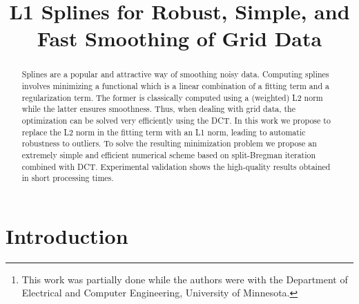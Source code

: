 \documentclass[preprint]{imsart}
\begin{document}
\begin{frontmatter}
\title{L1 Splines for Robust, Simple, and Fast Smoothing of Grid Data}

\begin{aug}
  \author{
     
  }

  \author{
     
  }

  \address{
    Department of Electrical and Computer Engineering, Duke University.\footnote{This work was partially done while the authors were with the Department of Electrical and Computer Engineering, University of Minnesota.}\\
  }
  

\end{aug}

\begin{abstract}
Splines are a popular and attractive way of smoothing noisy data. Computing splines involves minimizing a functional which is a linear combination of a fitting term and a regularization term. The former is classically computed using a (weighted) L2 norm while the latter ensures smoothness. Thus, when dealing with grid data, the optimization can be solved very efficiently using the DCT. In this work we propose to replace the L2 norm in the fitting term with an L1 norm, leading to automatic robustness to outliers. To solve the resulting minimization problem we propose an extremely simple and efficient numerical scheme based on split-Bregman iteration combined with DCT. Experimental validation shows the high-quality results obtained in short processing times.
\end{abstract}

\begin{keyword}
\end{keyword}

\end{frontmatter}

\maketitle

\section{Introduction}
\end{document}
